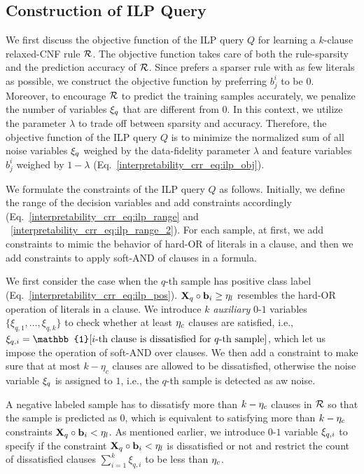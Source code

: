 \subsection{Construction of ILP Query}
\label{interpretability_crr_sec:ilp_query}
We first discuss the objective function of the  ILP query $ Q $ for learning  a $ k $-clause relaxed-CNF rule  $ {\mathcal{R}} $. The objective function takes care of  both the rule-sparsity and the prediction accuracy of $ {\mathcal{R}} $. Since {\crr} prefers a sparser rule  with as few literals as possible, we construct the objective function by preferring  $ b^i_j $ to be  $ 0 $. Moreover, to encourage $ {\mathcal{R}} $ to predict  the training samples accurately, we penalize the number of variables $ \xi_q $ that are different from $ 0 $. In this context, we utilize  the   parameter $ \lambda $ to trade off between sparsity and accuracy.  Therefore,  the objective function of the ILP query $ Q $ is to minimize the normalized sum of all  noise variables $ \xi_q $  weighed  by the data-fidelity parameter $ \lambda $ and feature variables $ b^i_j $ weighed by $ 1-\lambda $ (Eq.~\ref{interpretability_crr_eq:ilp_obj}).

We formulate the constraints of the ILP query $ Q $ as follows. Initially, we define the range of the decision variables and   add constraints accordingly (Eq.~\ref{interpretability_crr_eq:ilp_range} and ~\ref{interpretability_crr_eq:ilp_range_2}).  For each sample, at first, we  add constraints to mimic the behavior of hard-OR of literals in a clause, and then we add constraints to apply  soft-AND of clauses in a formula. 

We first consider the case when  the $ q $-th  sample  has positive class label (Eq.~\ref{interpretability_crr_eq:ilp_pos}). 
$ {\mathbf{X}}_q\circ \mathbf{b}_i \ge \eta_l $ resembles the hard-OR operation of literals in a clause.  We introduce   $ k $ \emph{auxiliary} $ 0 $-$ 1 $ variables $ \{\xi_{q,1}, \dots, \xi_{q,k}\} $  to check whether at least $ \eta_c $ clauses are satisfied, i.e., $ \noise_{q,i}=\mathbb{1}[i\text{-th clause is dissatisfied for }q\text{-th sample}] $, which let us impose the operation of soft-AND over clauses.    We then add a constraint to make sure that at most $ k-\eta_{c} $ clauses are allowed to be dissatisfied, otherwise the noise variable $ \xi_q $  is assigned to $ 1 $, i.e., the $ q $-th sample is detected as aw noise.  
 



A negative labeled sample has to dissatisfy  more than $ k-\eta_c $ clauses in $ {\mathcal{R}} $ so that the sample is predicted as $ 0 $, which is equivalent to satisfying  more than $ k-\eta_c$ constraints $ {\mathbf{X}}_q\circ \mathbf{b}_i < \eta_l  $. As mentioned earlier, we  introduce $ 0 $-$ 1 $ variable $ \xi_{q,i} $ to specify if the constraint $ {\mathbf{X}}_q\circ \mathbf{b}_i < \eta_l  $ is dissatisfied or not and  restrict the count of dissatisfied clauses $ \sum_{i=1}^k\xi_{q,i} $ to be less than $ \eta_c $. 


